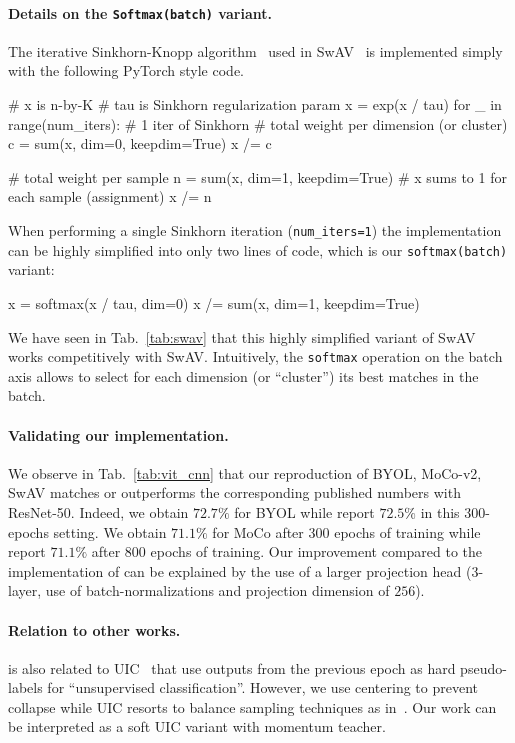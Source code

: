 \paragraph{Details on the \texttt{Softmax(batch)} variant.}
The iterative Sinkhorn-Knopp algorithm~\cite{cuturi2013sinkhorn} used in SwAV~\cite{caron2020unsupervised} is implemented simply with the following PyTorch style code.
\begin{python}
# x is n-by-K
# tau is Sinkhorn regularization param
x = exp(x / tau)
for _ in range(num_iters): # 1 iter of Sinkhorn
	# total weight per dimension (or cluster)
	c = sum(x, dim=0, keepdim=True) 
	x /= c

	# total weight per sample
	n = sum(x, dim=1, keepdim=True) 
	# x sums to 1 for each sample (assignment)
	x /= n 
\end{python}
When performing a single Sinkhorn iteration (\texttt{num\_iters=1}) the implementation can be highly simplified into only two lines of code, which is our \texttt{softmax(batch)} variant:
\begin{python}
x = softmax(x / tau, dim=0)
x /= sum(x, dim=1, keepdim=True) 
\end{python}
We have seen in Tab.~\ref{tab:swav} that this highly simplified variant of SwAV works competitively with SwAV.
Intuitively, the \texttt{softmax} operation on the batch axis allows to select for each dimension (or ``cluster'') its best matches in the batch.


\paragraph{Validating our implementation.}
We observe in Tab.~\ref{tab:vit_cnn} that our reproduction of BYOL, MoCo-v2, SwAV matches or outperforms the corresponding published numbers with ResNet-50.
Indeed, we obtain $72.7\%$ for BYOL while \cite{grill2020bootstrap} report $72.5\%$ in this $300$-epochs setting.
We obtain $71.1\%$ for MoCo after $300$ epochs of training while \cite{chen2020improved} report $71.1\%$ after $800$ epochs of training.
Our improvement compared to the implementation of \cite{chen2020improved} can be explained by the use of a larger projection head (3-layer, use of batch-normalizations and projection dimension of $256$).

\paragraph{Relation to other works.}
\OURS is also related to UIC~\cite{chen2020unsupervised} that use outputs from the previous epoch as hard pseudo-labels for ``unsupervised classification''.
However, we use centering to prevent collapse while UIC resorts to balance sampling techniques as in~\cite{caron2018deep}.
Our work can be interpreted as a soft UIC variant with momentum teacher.

